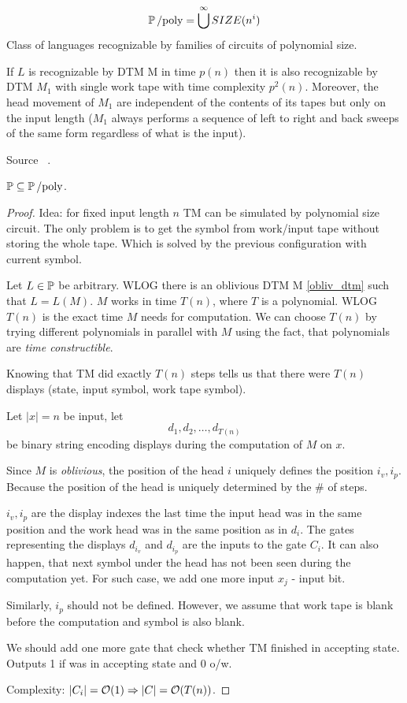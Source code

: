 \begin{definition}
	\[ \operatorname{\operatorname{\mathbb{P}}/poly} = \bigcup^{\infty} SIZE (n^i) \]
	Class of languages recognizable by families of circuits of polynomial size.
\end{definition}

\begin{definition}\label{obliv_dtm}
	If $L$ is recognizable by DTM M in time $p(n)$ then it is also recognizable by DTM $M_1$ with single work tape with time complexity $p^2(n)$.
	Moreover, the head movement of $M_1$ are independent of the contents of its tapes but only on the input length ($M_1$ always performs a sequence of left to right and back sweeps of the same form regardless of what is the input).

	Source ~\cite[p. 37]{arora2009computational}.
\end{definition}

\begin{theorem}[$\TP \subseteq \Ppoly$]\label{tp_ppoly}
	$\TP \subseteq \Ppoly$.
\end{theorem}
\begin{proof}
	Idea: for fixed input length $n$ TM can be simulated by polynomial size circuit.
	The only problem is to get the symbol from work/input tape without storing the whole tape.
	Which is solved by the previous configuration with current symbol.

	Let $L \in \operatorname{\mathbb{P}}$ be arbitrary. WLOG there is an oblivious DTM M \cref{obliv_dtm} such that $L = L(M)$.
	$M$ works in time $T(n)$, where $T$ is a polynomial.
	WLOG $T(n)$ is the exact time $M$ needs for computation.
	We can choose $T(n)$ by trying different polynomials in parallel with $M$ using the fact, that polynomials are \emph{time constructible}.

	Knowing that TM did exactly $T(n)$ steps tells us that there were $T(n)$ displays (state, input symbol, work tape symbol).

	Let $|x| = n$ be input, let
	\[ d_1, d_2, \ldots, d_{T(n)} \]
	be binary string encoding displays during the computation of $M$ on $x$.

	Since $M$ is \emph{oblivious}, the position of the head $i$ uniquely defines the position $i_v, i_p$.
	Because the position of the head is uniquely determined by the \# of steps.

	$i_v, i_p$ are the display indexes the last time the input head was in the same position and the work head was in the same position as in $d_i$.
	The gates representing the displays $d_{i_v}$ and $d_{i_p}$ are the inputs to the gate $C_i$.
	It can also happen, that next symbol under the head has not been seen during the computation yet.
	For such case, we add one more input $x_j$ - input bit.

	Similarly, $i_p$ should not be defined.
	However, we assume that work tape is blank before the computation and symbol is also blank.

	We should add one more gate that check whether TM finished in accepting state.
	Outputs 1 if was in accepting state and 0 o/w.

	Complexity: $|C_i| = \mathcal{O}(1) \Rightarrow |C| = \mathcal{O}(T(n))$.
\end{proof}

